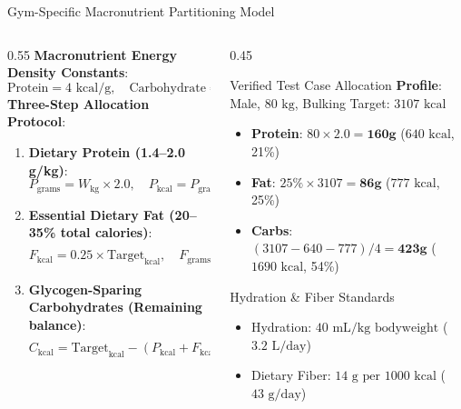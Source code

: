 \documentclass[aspectratio=169,10pt]{beamer}
\begin{document}
\begin{frame}{Gym-Specific Macronutrient Partitioning Model}
  \begin{columns}[T]
    \begin{column}{0.55\textwidth}
      \textbf{Macronutrient Energy Density Constants}:
      \begin{equation*}
        \text{Protein} = 4\text{ kcal/g}, \quad \text{Carbohydrate} = 4\text{ kcal/g}, \quad \text{Fat} = 9\text{ kcal/g}
      \end{equation*}
      \textbf{Three-Step Allocation Protocol}:
      \begin{enumerate}
        \item \textbf{Dietary Protein (1.4--2.0 g/kg)}:
        \[
          P_{\text{grams}} = W_{\text{kg}} \times 2.0, \quad P_{\text{kcal}} = P_{\text{grams}} \times 4
        \]
        \item \textbf{Essential Dietary Fat (20--35\% total calories)}:
        \[
          F_{\text{kcal}} = 0.25 \times \text{Target}_{\text{kcal}}, \quad F_{\text{grams}} = \frac{F_{\text{kcal}}}{9}
        \]
        \item \textbf{Glycogen-Sparing Carbohydrates (Remaining balance)}:
        \[
          C_{\text{kcal}} = \text{Target}_{\text{kcal}} - (P_{\text{kcal}} + F_{\text{kcal}}), \quad C_{\text{grams}} = \frac{C_{\text{kcal}}}{4}
        \]
      \end{enumerate}
    \end{column}
    \begin{column}{0.45\textwidth}
      \begin{exampleblock}{Verified Test Case Allocation}
        \textbf{Profile}: Male, $80\text{ kg}$, Bulking Target: $3107\text{ kcal}$
        \begin{itemize}
          \item \textbf{Protein}: $80 \times 2.0 = \mathbf{160\text{g}}$ ($640\text{ kcal}$, 21\%)
          \item \textbf{Fat}: $25\% \times 3107 = \mathbf{86\text{g}}$ ($777\text{ kcal}$, 25\%)
          \item \textbf{Carbs}: $(3107 - 640 - 777)/4 = \mathbf{423\text{g}}$ ($1690\text{ kcal}$, 54\%)
        \end{itemize}
      \end{exampleblock}
      \begin{alertblock}{Hydration \& Fiber Standards}
        \begin{itemize}
          \item Hydration: $40\text{ mL/kg bodyweight}$ ($3.2\text{ L/day}$)
          \item Dietary Fiber: $14\text{ g per } 1000\text{ kcal}$ ($43\text{ g/day}$)
        \end{itemize}
      \end{alertblock}
    \end{column}
  \end{columns}
\end{frame}
\end{document}
